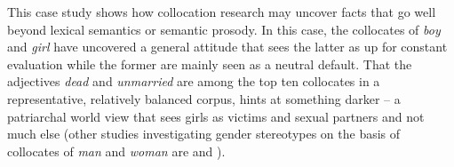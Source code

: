 This case study shows how collocation  research may uncover facts that go well beyond lexical semantics  or semantic prosody. In this case, the collocates of \textit{boy} and \textit{girl} have uncovered a general attitude that sees the latter as up for constant evaluation while the former are mainly seen as a neutral default.  That the adjectives  \textit{dead} and \textit{unmarried} are among the top ten collocates  in a representative,  relatively balanced corpus, hints at something darker -- a patriarchal world view that sees girls as victims and sexual partners and not much else (other studies investigating gender stereotypes on the basis of collocates of \textit{man} and \textit{woman} are \citet{gesuato_company_2003} and \citet{pearce_investigating_2008}).

